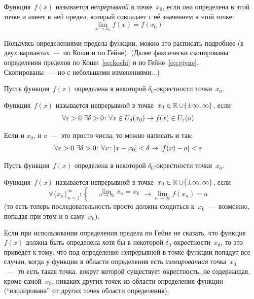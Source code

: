 \documentclass[a4paper,12pt]{article}
\begin{document}
  Функция~$f(x)$ называется \emph{непрерывной} в точке~$x_0$, если она определена в этой точке и имеет в ней предел, который совпадает с её значением в этой точке:
  \[
    \lim_{x \to x_0} f(x) = f(x_0)
  \]

  Пользуясь определениями предела функции, можно это расписать подробнее (в двух вариантах~---~по Коши и по Гейне).
  (Далее фактически скопированы определения пределов по Коши~\eqref{eq:koshi} и по Гейне~\eqref{eq:giyne}.
  Скопированы~---~но с небольшими изменениями...)

  \begin{definition}
    Пусть функция~$f(x)$ определена в некоторой $\delta_0$-окрестности точки~$x_0$.

    Функция~$f(x)$ называется непрерывной в точке~$x_0 \hm\in \RR \hm\cup \{\pm \infty, \infty\}$, если
    \begin{equation}
      \forall \varepsilon > 0\ \exists \delta > 0\colon \forall x \in U_{\delta}(x_0) \to f(x) \in U_{\varepsilon}(a)
    \end{equation}

    Если и $x_0$, и $a$~---~это просто числа, то можно написать и так:
    \[
      \forall \varepsilon > 0\ \exists \delta > 0\colon \forall x\colon |x - x_0| < \delta \to |f(x) - a| < \varepsilon
    \]
  \end{definition}

  \begin{definition}
    Пусть функция~$f(x)$ определена в некоторой $\delta_0$-окрестности точки~$x_0$.

    Функция~$f(x)$ называется непрерывной в точке~$x_0 \hm\in \RR \hm\cup \{\pm \infty, \infty\}$, если
    \begin{equation}
      \forall \{x_n\}_{n=1}^{\infty}\colon \left\{
        \begin{aligned}
          &\lim_{n \to \infty} x_n = x_0\\
        \end{aligned}
      \right.
      \to \lim_{n \to \infty} f(x_n) = a
    \end{equation}
    (то есть теперь последовательность просто должна сходиться к~$x_0$~---~возможно, попадая при этом и в саму~$x_0$).
  \end{definition}

  \begin{remark}
    Если при использовании определения предела по Гейне не сказать, что функция~$f(x)$ должна быть определена хотя бы в некоторой $\delta_0$-окрестности~$x_0$, то это приведёт к тому, что под определение непрерывной в точке функции попадут все случаи, когда у функции в области определения есть \emph{изолированная} точка~$x_0$~---~то есть такая точка, вокруг которой существует окрестность, не содержащая, кроме самой~$x_0$, никаких других точек из области определения функции (``изолирована'' от других точек области определения).
  \end{remark}
\end{document}
